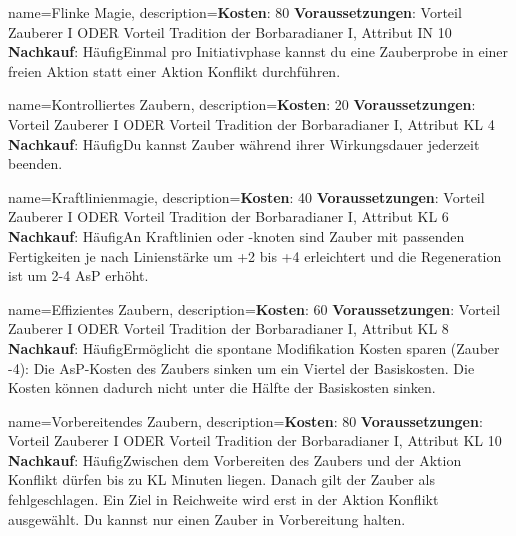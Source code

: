 {
    name={Flinke Magie},
    description={\textbf{Kosten}: 80 \textbf{Voraussetzungen}: Vorteil Zauberer I ODER Vorteil Tradition der Borbaradianer I, Attribut IN 10 \textbf{Nachkauf}: Häufig\newline Einmal pro Initiativphase kannst du eine Zauberprobe in einer freien Aktion statt einer Aktion Konflikt durchführen.}
}


{
    name={Kontrolliertes Zaubern},
    description={\textbf{Kosten}: 20 \textbf{Voraussetzungen}: Vorteil Zauberer I ODER Vorteil Tradition der Borbaradianer I, Attribut KL 4 \textbf{Nachkauf}: Häufig\newline Du kannst Zauber während ihrer Wirkungsdauer jederzeit beenden.}
}


{
    name={Kraftlinienmagie},
    description={\textbf{Kosten}: 40 \textbf{Voraussetzungen}: Vorteil Zauberer I ODER Vorteil Tradition der Borbaradianer I, Attribut KL 6 \textbf{Nachkauf}: Häufig\newline An Kraftlinien oder -knoten sind Zauber mit passenden Fertigkeiten je nach Linienstärke um +2 bis +4 erleichtert und die Regeneration ist um 2-4 AsP erhöht.}
}


{
    name={Effizientes Zaubern},
    description={\textbf{Kosten}: 60 \textbf{Voraussetzungen}: Vorteil Zauberer I ODER Vorteil Tradition der Borbaradianer I, Attribut KL 8 \textbf{Nachkauf}: Häufig\newline Ermöglicht die spontane Modifikation Kosten sparen (Zauber -4): Die AsP-Kosten des Zaubers sinken um ein Viertel der Basiskosten. Die Kosten können dadurch nicht unter die Hälfte der Basiskosten sinken.}
}


{
    name={Vorbereitendes Zaubern},
    description={\textbf{Kosten}: 80 \textbf{Voraussetzungen}: Vorteil Zauberer I ODER Vorteil Tradition der Borbaradianer I, Attribut KL 10 \textbf{Nachkauf}: Häufig\newline Zwischen dem Vorbereiten des Zaubers und der Aktion Konflikt dürfen bis zu KL Minuten liegen. Danach gilt der Zauber als fehlgeschlagen. Ein Ziel in Reichweite wird erst in der Aktion Konflikt ausgewählt. Du kannst nur einen Zauber in Vorbereitung halten.}
}


